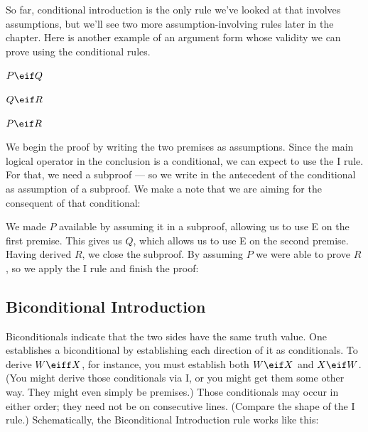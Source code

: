 So far, conditional introduction is the only rule we've looked at that involves assumptions, but we'll see two more assumption-involving rules later in the chapter.
Here is another example of an argument form whose validity we can prove using the conditional rules.


\begin{earg}
\item[] $P \eif Q$
\item[] $Q \eif R$
\item[\therefore] $P \eif R$
\end{earg}
We begin the proof by writing the two premises as assumptions. Since the main logical operator in the conclusion is a conditional, we can expect to use the {\eif}I rule. For that, we need a subproof --- so we write in the antecedent of the conditional as assumption of a subproof. We make a note that we are aiming for the consequent of that conditional:

\begin{ndproof}
	\open
		 
	\close
\end{ndproof}

We made $P$ available by assuming it in a subproof, allowing us to use {\eif}E on the first premise. This gives us $Q$, which allows us to use {\eif}E on the second premise. Having derived $R$, we close the subproof. By assuming $P$ we were able to prove $R$, so we apply the {\eif}I rule and finish the proof:
\label{HSproof}
\begin{ndproof}
	\open
	\close
\end{ndproof}




\subsection{Biconditional Introduction}
Biconditionals indicate that the two sides have the same truth value. One establishes a biconditional by establishing each direction of it as conditionals. To derive $W \eiff X$, for instance, you must establish both $W \eif X$ and $X \eif W$. (You might derive those conditionals via {\eif}I, or you might get them some other way. They might even simply be premises.) Those conditionals may occur in either order; they need not be on consecutive lines. (Compare the shape of the {\eand}I rule.) Schematically, the Biconditional Introduction rule works like this:

